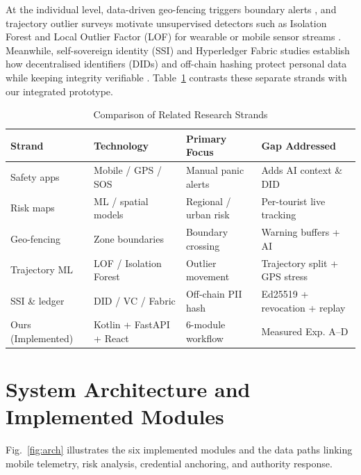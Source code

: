\documentclass[conference]{IEEEtran}
\begin{document}
At the individual level, data-driven geo-fencing triggers boundary alerts \cite{sasaki2024}, and trajectory outlier surveys motivate unsupervised detectors such as Isolation Forest and Local Outlier Factor (LOF) for wearable or mobile sensor streams \cite{belhadi2020,chandola2009,ali2025}. Meanwhile, self-sovereign identity (SSI) and Hyperledger Fabric studies establish how decentralised identifiers (DIDs) and off-chain hashing protect personal data while keeping integrity verifiable \cite{mazzocca2025,muhle2018,soltani2021,figueroa2021,akhison2025,khairnar2025,mountije2025,prados2023,rana2022,zyskind2015}. Table~\ref{tab:related} contrasts these separate strands with our integrated prototype.

\begin{table}[t]
\centering
\caption{Comparison of Related Research Strands}
\label{tab:related}
\scriptsize
\begin{tabular}{@{}p{1.9cm}p{1.7cm}p{1.8cm}p{2.1cm}@{}}
\toprule
\textbf{Strand} & \textbf{Technology} & \textbf{Primary Focus} & \textbf{Gap Addressed} \\
\midrule
Safety apps \cite{aliperti2020,chiranjeevi2026} & Mobile / GPS / SOS & Manual panic alerts & Adds AI context \& DID \\
Risk maps \cite{li2026,josephi2026,hakyemez2025} & ML / spatial models & Regional / urban risk & Per-tourist live tracking \\
Geo-fencing \cite{sasaki2024} & Zone boundaries & Boundary crossing & Warning buffers + AI \\
Trajectory ML \cite{belhadi2020,ali2025} & LOF / Isolation Forest & Outlier movement & Trajectory split + GPS stress \\
SSI \& ledger \cite{mazzocca2025,figueroa2021,zyskind2015} & DID / VC / Fabric & Off-chain PII hash & Ed25519 + revocation + replay \\
Ours (Implemented) & Kotlin + FastAPI + React & 6-module workflow & Measured Exp. A--D \\
\bottomrule
\end{tabular}
\end{table}

\section{System Architecture and Implemented Modules}
Fig.~\ref{fig:arch} illustrates the six implemented modules and the data paths linking mobile telemetry, risk analysis, credential anchoring, and authority response.
\end{document}
